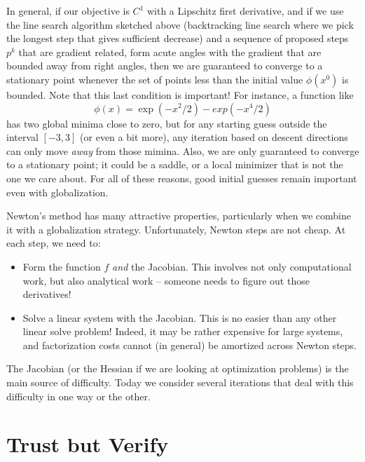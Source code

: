 \documentclass[12pt, leqno]{article} %
\begin{document}
In general, if our objective is $C^1$ with a Lipschitz first
derivative, and if we use the line search algorithm sketched above
(backtracking line search where we pick the longest step that gives
sufficient decrease) and a sequence of proposed steps $p^k$ that
are gradient related, form acute angles with the gradient that are
bounded away from right angles, then we are guaranteed to converge
to a stationary point whenever the set of points less than the initial
value $\phi(x^0)$ is bounded.  Note that this last condition is
important!  For instance, a function like
\[
  \phi(x) = \exp(-x^2/2)-exp(-x^4/2)
\]
has two global minima close to zero, but for any starting guess
outside the interval $[-3,3]$ (or even a bit more), any iteration
based on descent directions can only move {\em away} from those
mimina.  Also, we are only guaranteed to converge to a stationary
point; it could be a saddle, or a local minimizer that is not the one
we care about.  For all of these reasons, good initial guesses remain
important even with globalization.

Newton's method has many attractive properties, particularly when we
combine it with a globalization strategy.  Unfortunately, Newton steps
are not cheap.  At each step, we need to:
\begin{itemize}
\item Form the function $f$ {\em and} the Jacobian.  This involves not
  only computational work, but also analytical work -- someone needs
  to figure out those derivatives!
\item Solve a linear system with the Jacobian.  This is no easier than
  any other linear solve problem!  Indeed, it may be rather expensive
  for large systems, and factorization costs cannot (in general) be
  amortized across Newton steps.
\end{itemize}
The Jacobian (or the Hessian if we are looking at optimization
problems) is the main source of difficulty.  Today we consider several
iterations that deal with this difficulty in one way or the other.

\section*{Trust but Verify}
\end{document}
